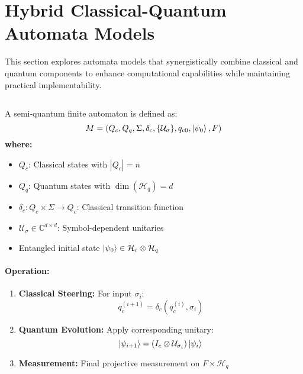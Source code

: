 \section{Hybrid Classical-Quantum Automata Models}
\label{sec:hybrid-qfa}

This section explores automata models that synergistically combine classical and quantum components to enhance computational capabilities while maintaining practical implementability.

\subsection{}
\label{subsec:sqa}

\begin{definition}
A semi-quantum finite automaton is defined as:
\[
M = (Q_c, Q_q, \Sigma, \delta_c, \{\mathcal{U}_\sigma\}, q_{c0}, \ket{\psi_0}, F)
\]
\textbf{where:}
\begin{itemize}
    \item $Q_c$: Classical states with $|Q_c| = n$
    \item $Q_q$: Quantum states with $\dim(\mathcal{H}_q) = d$
    \item $\delta_c: Q_c \times \Sigma \rightarrow Q_c$: Classical transition function
    \item $\mathcal{U}_\sigma \in \mathbb{C}^{d \times d}$: Symbol-dependent unitaries
    \item Entangled initial state $\ket{\psi_0} \in \mathcal{H}_c \otimes \mathcal{H}_q$
\end{itemize}
\end{definition}

\paragraph{Operation:}
\begin{enumerate}
    \item \textbf{Classical Steering:} For input $\sigma_i$:
    \[
    q_c^{(i+1)} = \delta_c(q_c^{(i)}, \sigma_i)
    \]
    \item \textbf{Quantum Evolution:} Apply corresponding unitary:
    \[
    \ket{\psi_{i+1}} = (I_c \otimes \mathcal{U}_{\sigma_i}) \ket{\psi_i}
    \]
    \item \textbf{Measurement:} Final projective measurement on $F \times \mathcal{H}_q$
\end{enumerate}

